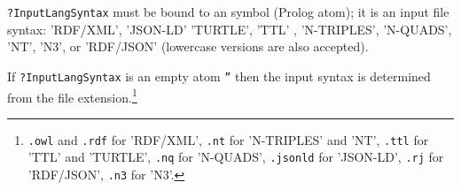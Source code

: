   \texttt{?InputLangSyntax}  must be bound to an \ERGO symbol (Prolog atom);
  it is an input file syntax: 
  'RDF/XML',
  'JSON-LD'
  'TURTLE',
  'TTL'	,
  'N-TRIPLES',
  'N-QUADS',
  'NT',
  'N3', or
  'RDF/JSON' (lowercase versions are also accepted).

  If \texttt{?InputLangSyntax} is an empty atom \texttt{''} then the input
  syntax is determined from the file extension.\footnote{
    \texttt{.owl} and \texttt{.rdf}  for  'RDF/XML',
    \texttt{.nt} for 'N-TRIPLES' and 'NT',
    \texttt{.ttl} for 'TTL' and 'TURTLE',
    \texttt{.nq} for 'N-QUADS', 
    \texttt{.jsonld} for 'JSON-LD',
    \texttt{.rj} for 'RDF/JSON',
    \texttt{.n3} for 'N3'. 
    }

